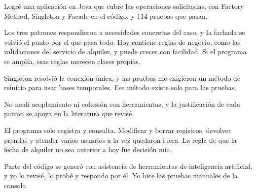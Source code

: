 %
%

Logré una aplicación en Java que cubre las operaciones solicitadas, con Factory Method, Singleton y Facade en el código, y 114 pruebas que pasan.

Los tres patrones respondieron a necesidades concretas del caso, y la fachada se volvió el punto por el que pasa todo. Hoy contiene reglas de negocio, como las validaciones del servicio de alquiler, y puede crecer con facilidad. Si el programa se amplía, esas reglas merecen clases propias.

Singleton resolvió la conexión única, y las pruebas me exigieron un método de reinicio para usar bases temporales. Ese método existe solo para las pruebas.

No medí acoplamiento ni cohesión con herramientas, y la justificación de cada patrón se apoya en la literatura que revisé.

El programa solo registra y consulta. Modificar y borrar registros, devolver prendas y atender varios usuarios a la vez quedaron fuera. La regla de que la fecha de alquiler no sea anterior a hoy fue decisión mía.

Parte del código se generó con asistencia de herramientas de inteligencia artificial, y yo lo revisé, lo probé y respondo por él. Yo hice las pruebas manuales de la consola.
